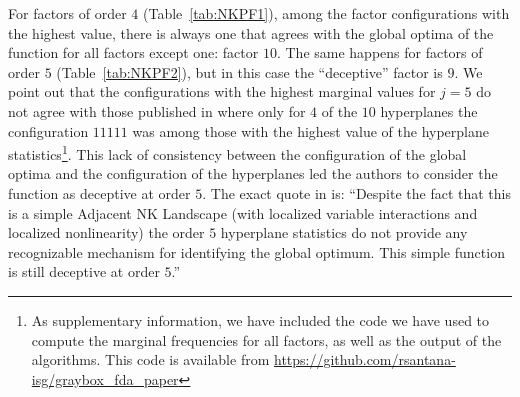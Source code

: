 \documentclass{article} %
\begin{document}
 For factors of order $4$ (Table~\ref{tab:NKPF1}), among the factor configurations with the highest value, there is always one that agrees with the global optima of the function for all factors except one: factor $10$. The same happens for factors of order $5$ (Table~\ref{tab:NKPF2}), but in this case the ``deceptive'' factor is $9$.   We point out that the configurations with the highest marginal values for $j=5$  do not agree with those published in  \cite{Whitley:2015,Whitley_et_al:2016} where only for $4$ of the $10$ hyperplanes the configuration $11111$ was among those with the highest value of the hyperplane statistics\footnote{As supplementary information, we have included the code we have used to compute the marginal frequencies for all factors, as well as the output of the algorithms.  This code is available from \url{https://github.com/rsantana-isg/graybox_fda_paper}}. This lack of consistency between the configuration of the global optima and the configuration of the hyperplanes led the authors to consider the function as deceptive at order $5$. The exact quote in \cite{Whitley_et_al:2016} is: ``Despite the fact that this is a simple Adjacent NK Landscape (with localized variable interactions and localized nonlinearity) the order $5$ hyperplane statistics do not provide any recognizable mechanism for identifying the global optimum. This simple function is still deceptive at order $5$.''

 
\end{document}
